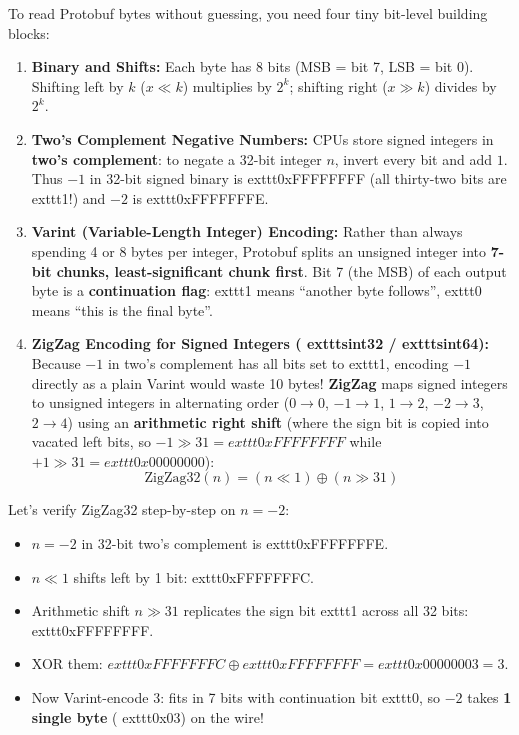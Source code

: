 To read Protobuf bytes without guessing, you need four tiny bit-level building blocks:

\begin{enumerate}[leftmargin=15pt]
  \item \textbf{Binary and Shifts:} Each byte has 8 bits (MSB = bit 7, LSB = bit 0). Shifting left by $k$ ($x \ll k$) multiplies by $2^k$; shifting right ($x \gg k$) divides by $2^k$.
  \item \textbf{Two's Complement Negative Numbers:} CPUs store signed integers in \textbf{two's complement}: to negate a 32-bit integer $n$, invert every bit and add $1$. Thus $-1$ in 32-bit signed binary is 	exttt{0xFFFFFFFF} (all thirty-two bits are 	exttt{1}!) and $-2$ is 	exttt{0xFFFFFFFE}.
  \item \textbf{Varint (Variable-Length Integer) Encoding:} Rather than always spending 4 or 8 bytes per integer, Protobuf splits an unsigned integer into \textbf{7-bit chunks, least-significant chunk first}. Bit 7 (the MSB) of each output byte is a \textbf{continuation flag}: 	exttt{1} means ``another byte follows'', 	exttt{0} means ``this is the final byte''.
  \item \textbf{ZigZag Encoding for Signed Integers (	exttt{sint32} / 	exttt{sint64}):} Because $-1$ in two's complement has all bits set to 	exttt{1}, encoding $-1$ directly as a plain Varint would waste 10 bytes! \textbf{ZigZag} maps signed integers to unsigned integers in alternating order ($0 \to 0$, $-1 \to 1$, $1 \to 2$, $-2 \to 3$, $2 \to 4$) using an \textbf{arithmetic right shift} (where the sign bit is copied into vacated left bits, so $-1 \gg 31 = 	exttt{0xFFFFFFFF}$ while $+1 \gg 31 = 	exttt{0x00000000}$):
  $$\text{ZigZag32}(n) = (n \ll 1) \oplus (n \gg 31)$$
\end{enumerate}

Let's verify ZigZag32 step-by-step on $n = -2$:
\begin{itemize}[leftmargin=15pt]
  \item $n = -2$ in 32-bit two's complement is 	exttt{0xFFFFFFFE}.
  \item $n \ll 1$ shifts left by 1 bit: 	exttt{0xFFFFFFFC}.
  \item Arithmetic shift $n \gg 31$ replicates the sign bit 	exttt{1} across all 32 bits: 	exttt{0xFFFFFFFF}.
  \item XOR them: $	exttt{0xFFFFFFFC} \oplus 	exttt{0xFFFFFFFF} = 	exttt{0x00000003} = 3$.
  \item Now Varint-encode $3$: fits in 7 bits with continuation bit 	exttt{0}, so $-2$ takes \textbf{1 single byte} (	exttt{0x03}) on the wire!
\end{itemize}


